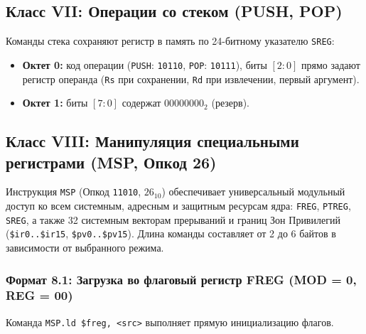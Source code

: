 \documentclass[11pt,a4paper]{article}
\newcommand{\reg}[1]{\texttt{#1}}
\newcommand{\bits}[1]{\texttt{#1}}
\begin{document}
\subsection{Класс VII: Операции со стеком (PUSH, POP)}
Команды стека сохраняют регистр в память по 24-битному указателю \reg{SREG}:
\begin{itemize}
  \item \textbf{Октет 0:} код операции (\texttt{PUSH}: \bits{10110}, \texttt{POP}: \bits{10111}), биты $[2:0]$ прямо задают регистр операнда (\reg{Rs} при сохранении, \reg{Rd} при извлечении, первый аргумент).
  \item \textbf{Октет 1:} биты $[7:0]$ содержат $00000000_2$ (резерв).
\end{itemize}

\subsection{Класс VIII: Манипуляция специальными регистрами (MSP, Опкод 26)}
Инструкция \texttt{MSP} (Опкод \bits{11010}, $26_{10}$) обеспечивает универсальный модульный доступ ко всем системным, адресным и защитным ресурсам ядра: \reg{FREG}, \reg{PTREG}, \reg{SREG}, а также 32 системным векторам прерываний и границ Зон Привилегий (\texttt{\$ir0..\$ir15}, \texttt{\$pv0..\$pv15}). Длина команды составляет от 2 до 6 байтов в зависимости от выбранного режима.

\subsubsection{Формат 8.1: Загрузка во флаговый регистр FREG (MOD = 0, REG = 00)}
Команда \texttt{MSP.ld \$freg, <src>} выполняет прямую инициализацию флагов.
\end{document}
